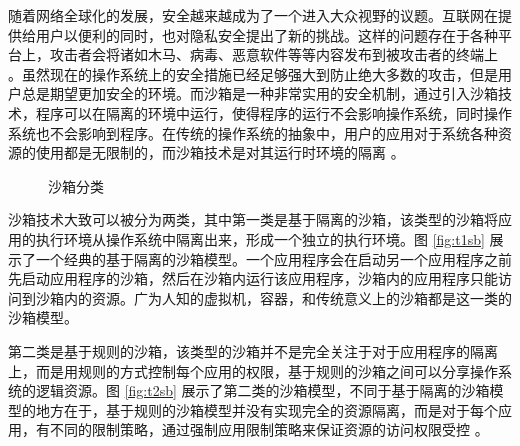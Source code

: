 \documentclass[final,12pt]{elsarticle}
\begin{document}
随着网络全球化的发展，安全越来越成为了一个进入大众视野的议题。互联网在提供给用户以便利的同时，也对隐私安全提出了新的挑战。这样的问题存在于各种平台上，攻击者会将诸如木马、病毒、恶意软件等等内容发布到被攻击者的终端上 \cite{miwa}。虽然现在的操作系统上的安全措施已经足够强大到防止绝大多数的攻击，但是用户总是期望更加安全的环境。而沙箱是一种非常实用的安全机制，通过引入沙箱技术，程序可以在隔离的环境中运行，使得程序的运行不会影响操作系统，同时操作系统也不会影响到程序。在传统的操作系统的抽象中，用户的应用对于系统各种资源的使用都是无限制的，而沙箱技术是对其运行时环境的隔离 \cite{sandbox}。

\begin{figure}
\centering
{}
\caption{沙箱分类}
\end{figure}

沙箱技术大致可以被分为两类，其中第一类是基于隔离的沙箱，该类型的沙箱将应用的执行环境从操作系统中隔离出来，形成一个独立的执行环境。图 \ref{fig:t1sb} 展示了一个经典的基于隔离的沙箱模型。一个应用程序会在启动另一个应用程序之前先启动应用程序的沙箱，然后在沙箱内运行该应用程序，沙箱内的应用程序只能访问到沙箱内的资源。广为人知的虚拟机，容器，和传统意义上的沙箱都是这一类的沙箱模型。

第二类是基于规则的沙箱，该类型的沙箱并不是完全关注于对于应用程序的隔离上，而是用规则的方式控制每个应用的权限，基于规则的沙箱之间可以分享操作系统的逻辑资源。图 \ref{fig:t2sb} 展示了第二类的沙箱模型，不同于基于隔离的沙箱模型的地方在于，基于规则的沙箱模型并没有实现完全的资源隔离，而是对于每个应用，有不同的限制策略，通过强制应用限制策略来保证资源的访问权限受控 \cite{schreuders}。
\end{document}
